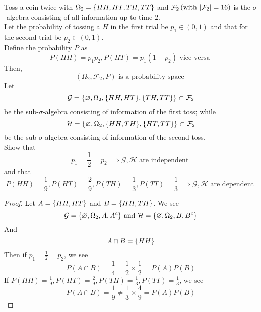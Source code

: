 \documentclass{report}
\begin{document}
\begin{question}{}{}
Toss a coin twice with $\Omega_2=\{ HH,HT,TH,TT \}$ and $\mathcal{F}_2\left(\text{with }|\mathcal{F}_2|=16 \right)$ is the $\sigma$-algebra consisting of all information up to time $2$.\\

Let the probability of tossing a  $H$ in the first trial be $p_1\in \left(0,1 \right)$  and that for the second trial be $p_2\in \left(0,1 \right)$.\\

Define the probability $P$ as 
\begin{equation*}
P\left(HH \right)=p_1p_2,P\left(HT \right)=p_1\left(1-p_2 \right)\text{ vice versa }
\end{equation*}
Then, 
\begin{equation*}
  \left(\Omega_2,\mathcal{F}_2,P \right)\text{ is a probability space }
\end{equation*}
Let 
\begin{equation*}
\mathcal{G}=\{ \varnothing,\Omega_2,\{ HH,HT \},\{ TH,TT \} \}\subset \mathcal{F}_2
\end{equation*}
be the sub-$\sigma$-algebra consisting of information of the first toss; while 
\begin{equation*}
\mathcal{H}=\{ \varnothing,\Omega_2,\{ HH,TH \},\{ HT,TT \} \}\subset \mathcal{F}_2
\end{equation*}
be the sub-$\sigma$-algebra consisting of information of the second toss.\\

Show that 
\begin{equation*}
p_1=\frac{1}{2}=p_2\implies \mathcal{G},\mathcal{H}\text{ are independent }
\end{equation*}
and that 
\begin{equation*}
P\left(HH \right)=\frac{1}{9},P\left(HT \right)=\frac{2}{9},P\left(TH \right)=\frac{1}{3},P\left(TT \right)=\frac{1}{3}\implies \mathcal{G},\mathcal{H}\text{ are dependent }
\end{equation*}
\end{question}
\begin{proof}
Let $A=\{ HH,HT \}$ and $B=\{ HH,TH \}$. We see 
\begin{equation*}
\mathcal{G}=\{ \varnothing,\Omega_2, A,A^c \}\text{ and }\mathcal{H}=\{ \varnothing,\Omega_2,B,B^c \}
\end{equation*}
And 
\begin{equation*}
A\cap B=\{ HH \}
\end{equation*}
Then if $p_1=\frac{1}{2}=p_2$, we see 
\begin{equation*}
P\left(A\cap B \right)=\frac{1}{4}=\frac{1}{2}\times \frac{1}{2}=P\left(A \right)P\left(B \right)
\end{equation*}
If $P\left(HH \right)=\frac{1}{9},P\left(HT \right)=\frac{2}{9},P\left(TH \right)=\frac{1}{3},P\left(TT \right)=\frac{1}{3}$, we see 
\begin{equation*}
P\left(A\cap B \right)=\frac{1}{9}\neq \frac{1}{3}\times \frac{4}{9}=P\left(A \right)P\left(B \right)
\end{equation*}
\end{proof}
\end{document}
